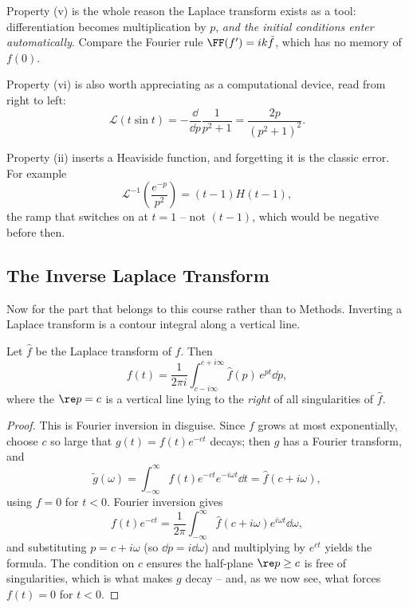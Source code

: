 Property (v) is the whole reason the Laplace transform exists as a tool: differentiation becomes multiplication by $p$, \emph{and the initial conditions enter automatically}. Compare the Fourier rule $\FF(f') = ik\tilde f$, which has no memory of $f(0)$.

Property (vi) is also worth appreciating as a computational device, read from right to left:
$$
\mathcal L(t \sin t) = -\frac{\dd}{\dd p} \frac{1}{p^2 + 1} = \frac{2p}{(p^2 + 1)^2}.
$$

\begin{example}
	Property (ii) inserts a Heaviside function, and forgetting it is the classic error. For example
	$$
	\mathcal{L}^{-1}\left(\frac{e^{-p}}{p^2}\right) = (t - 1)H(t - 1),
	$$
	the ramp that switches on at $t = 1$ -- not $(t-1)$, which would be negative before then.
\end{example}

\subsection{The Inverse Laplace Transform}

Now for the part that belongs to this course rather than to Methods. Inverting a Laplace transform is a contour integral along a vertical line.

\begin{theorem}
	Let $\hat f$ be the Laplace transform of $f$. Then
	$$
	f(t) = \frac{1}{2\pi i} \int_{c - i\infty}^{c + i\infty} \hat f(p) \, e^{pt} \dd p,
	$$
	where the  $\re p = c$ is a vertical line lying to the \emph{right} of all singularities of $\hat f$.
\end{theorem}
\begin{proof}
	This is Fourier inversion in disguise. Since $f$ grows at most exponentially, choose $c$ so large that $g(t) = f(t) e^{-ct}$ decays; then $g$ has a Fourier transform, and
	$$
	\tilde g(\omega) = \int_{-\infty}^\infty f(t) e^{-ct} e^{-i\omega t} \dd t = \hat f(c + i\omega),
	$$
	using $f = 0$ for $t < 0$. Fourier inversion gives
	$$
	f(t) e^{-ct} = \frac{1}{2\pi}\int_{-\infty}^\infty \hat f(c + i\omega) e^{i\omega t} \dd \omega,
	$$
	and substituting $p = c + i\omega$ (so $\dd p = i \dd \omega$) and multiplying by $e^{ct}$ yields the formula. The condition on $c$ ensures the half-plane $\re p \geq c$ is free of singularities, which is what makes $g$ decay -- and, as we now see, what forces $f(t) = 0$ for $t < 0$.
\end{proof}

